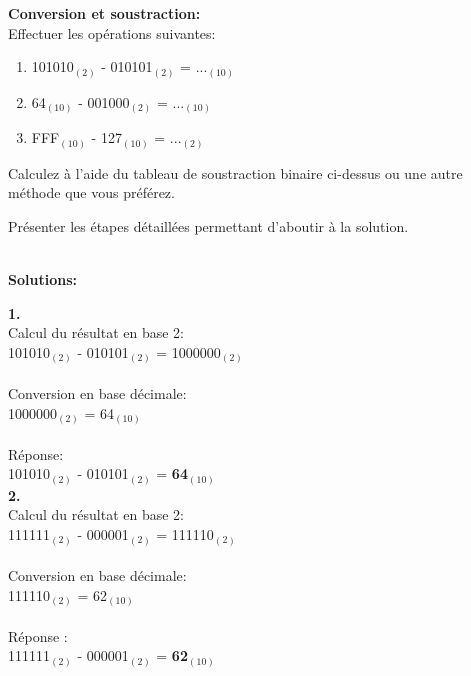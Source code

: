 \begin{Exercice}[20 minutes] \textbf{Conversion et soustraction:}\\
    Effectuer les opérations suivantes:
    \begin{enumerate}
        \item 101010$_{(2)}$ - 010101$_{(2)}$ = ...$_{(10)}$
        \item 64$_{(10)}$ - 001000$_{(2)}$ = ...$_{(10)}$
        \item FFF$_{(10)}$ - 127$_{(10)}$ = ...$_{(2)}$
    \end{enumerate}
    \begin{conseil}
            Calculez à l'aide du tableau de soustraction binaire ci-dessus ou une autre méthode que vous préférez.\\
    \end{conseil}
    \begin{solution}
        Présenter les étapes détaillées permettant d'aboutir à la solution.
    \end{solution}

    \textbf{\\ \faTerminal  Solutions:}
    
    \textbf{1.}\\
    Calcul du résultat en base 2:\\
    101010$_{(2)}$ - 010101$_{(2)}$ = 1000000$_{(2)}$\\\\
    Conversion en base décimale:\\
    1000000$_{(2)}$ = 64$_{(10)}$\\\\
    Réponse:\\
    101010$_{(2)}$ - 010101$_{(2)}$ = \textbf{64$_{(10)}$}\\
    
    \textbf{2.}\\
    Calcul du résultat en base 2:\\
    111111$_{(2)}$ - 000001$_{(2)}$ = 111110$_{(2)}$\\\\
    Conversion en base décimale:\\
    111110$_{(2)}$ = 62$_{(10)}$\\\\
    Réponse :\\
    111111$_{(2)}$ - 000001$_{(2)}$ = \textbf{62$_{(10)}$}\\


\end{Exercice}
